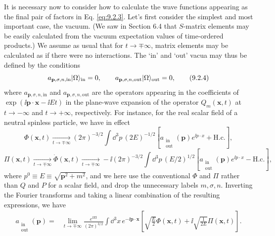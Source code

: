 It is necessary now to consider how to calculate the wave functions appearing
as the final pair of factors in Eq. \eqref{eq:9.2.3}. Let's first consider the simplest
and most important case, the vacuum. (We saw in Section 6.4 that $S$-matrix
elements may be easily calculated from the vacuum expectation values of
time-ordered products.) We assume as usual that for $t\to\mp\infty$, matrix
elements may be calculated as if there were no interactions. The `in' and
`out' vacua may thus be defined by the conditions
\begin{equation}
  a_{\mathbf{p},\sigma,n,\mathrm{in}}\lvert \Omega\rangle_{\mathrm{in}}=0,
  \qquad
  a_{\mathbf{p},\sigma,n,\mathrm{out}}\lvert \Omega\rangle_{\mathrm{out}}=0,
  \tag{9.2.4}\label{eq:9.2.4}
\end{equation}
where $a_{\mathbf{p},\sigma,n,\mathrm{in}}$ and
$a_{\mathbf{p},\sigma,n,\mathrm{out}}$ are the operators appearing
in the coefficients of $\exp(\ii\mathbf{p}\cdot\mathbf{x}-\ii Et)$ in the
plane-wave expansion of the operator $Q_m(\mathbf{x},t)$ at
$t\to-\infty$ and $t\to+\infty$, respectively. For instance, for the real
scalar field of a neutral spinless particle, we have in effect
\begin{equation}
  \Phi(\mathbf{x},t)\underset{t\to\mp\infty}{\longrightarrow}
  (2\pi)^{-3/2}\int \dd^3p\,(2E)^{-1/2}
  \left[a_{\substack{\mathrm{in}\\\mathrm{out}}}(\mathbf{p})
  e^{\ii p\cdot x}+\mathrm{H.c.}\right],
  \tag{9.2.5}\label{eq:9.2.5}
\end{equation}
\begin{equation}
  \Pi(\mathbf{x},t)\underset{t\to\mp\infty}{\longrightarrow}
  \dot\Phi(\mathbf{x},t)
  \underset{t\to\mp\infty}{\longrightarrow}
  -\ii(2\pi)^{-3/2}\int \dd^3p\,(E/2)^{1/2}
  \left[a_{\substack{\mathrm{in}\\\mathrm{out}}}(\mathbf{p})
  e^{\ii p\cdot x}-\mathrm{H.c.}\right],
  \tag{9.2.6}\label{eq:9.2.6}
\end{equation}
where $p^0\equiv E\equiv\sqrt{\mathbf{p}^2+m^2}$, and we here use the
conventional $\Phi$ and $\Pi$ rather than $Q$ and $P$ for a scalar field,
and drop the unnecessary labels $m,\sigma,n$. Inverting the Fourier
transforms and taking a linear combination of the resulting expressions, we
have
\begin{align}
  a_{\substack{\mathrm{in}\\\mathrm{out}}}(\mathbf{p})
  ={}&\lim_{t\to\mp\infty}\frac{e^{\ii Et}}{(2\pi)^{3/2}}
  \int \dd^3x\,e^{-\ii\mathbf{p}\cdot\mathbf{x}}
  \left[\sqrt{\frac{E}{2}}\Phi(\mathbf{x},t)
  +\ii\sqrt{\frac{1}{2E}}\Pi(\mathbf{x},t)\right].
  \tag{9.2.7}\label{eq:9.2.7}
\end{align}
